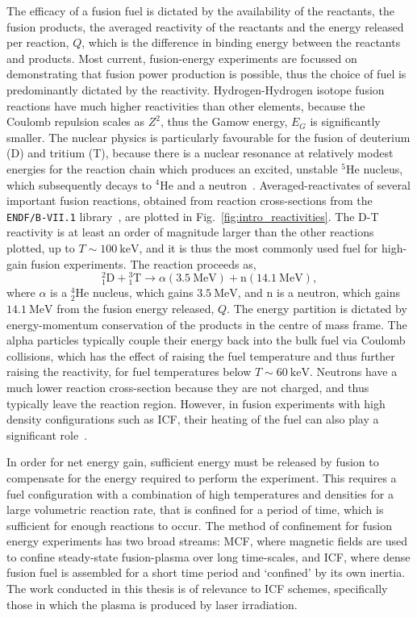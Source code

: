 The efficacy of a fusion fuel is dictated by the availability of the reactants, the fusion products, the averaged reactivity of the reactants and the energy released per reaction, $Q$, which is the difference in binding energy between the reactants and products.
Most current, fusion-energy experiments are focussed on demonstrating that fusion power production is possible, thus the choice of fuel is predominantly dictated by the reactivity.
Hydrogen-Hydrogen isotope fusion reactions have much higher reactivities than other elements, because the Coulomb repulsion scales as $Z^2$, thus the Gamow energy, $E_G$ is significantly smaller.
The nuclear physics is particularly favourable for the fusion of deuterium (D) and tritium (T), because there is a nuclear resonance at relatively modest energies for the reaction chain which produces an excited, unstable ${}^5 \text{He}$ nucleus, which subsequently decays to ${}^4\text{He}$ and a neutron~\cite{brown_field_2014}.
Averaged-reactivates of several important fusion reactions, obtained from reaction cross-sections from the \texttt{ENDF/B-VII.1} library~\cite{chadwick_endf_2011}, are plotted in Fig.~\ref{fig:intro_reactivities}.
The D-T reactivity is at least an order of magnitude larger than the other reactions plotted, up to $T\sim100\ \text{keV}$, and it is thus the most commonly used fuel for high-gain fusion experiments.
The reaction proceeds as,
\begin{equation}
    \label{eq:intro_DTreac}
    {}^{2}_{1}\text{D} + {}^{3}_{1}\text{T} \rightarrow \alpha(3.5\ \text{MeV}) + \text{n}(14.1\ \text{MeV}),
\end{equation}
where $\alpha$ is a ${}^{4}_{2}\text{He}$ nucleus, which gains $3.5\ \text{MeV}$, and $\text{n}$ is a neutron, which gains $14.1\ \text{MeV}$ from the fusion energy released, $Q$.
The energy partition is dictated by energy-momentum conservation of the products in the centre of mass frame.
The alpha particles typically couple their energy back into the bulk fuel via Coulomb collisions, which has the effect of raising the fuel temperature and thus further raising the reactivity, for fuel temperatures below $T\sim60\ \text{keV}$.
Neutrons have a much lower reaction cross-section because they are not charged, and thus typically leave the reaction region.
However, in fusion experiments with high density configurations such as \ac{ICF}, their heating of the fuel can also play a significant role~\cite{daughton_influence_2023}.

In order for net energy gain, sufficient energy must be released by fusion to compensate for the energy required to perform the experiment.
This requires a fuel configuration with a combination of high temperatures and densities for a large volumetric reaction rate, that is confined for a period of time, which is sufficient for enough reactions to occur.
The method of confinement for fusion energy experiments has two broad streams: \ac{MCF}, where magnetic fields are used to confine steady-state fusion-plasma over long time-scales, and \ac{ICF}, where dense fusion fuel is assembled for a short time period and `confined' by its own inertia.
The work conducted in this thesis is of relevance to \ac{ICF} schemes, specifically those in which the plasma is produced by laser irradiation.

